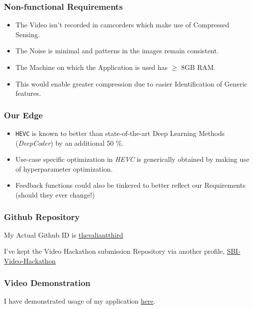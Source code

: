 \documentclass{beamer}
\begin{document}
\begin{frame}
    \frametitle{Non-functional Requirements}

    \begin{itemize}
        \item The Video isn't recorded in camcorders which make use of Compressed Sensing.
        \item The Noise is minimal and patterns in the images remain consistent.
        \item The Machine on which the Application is used has $\geq$ 8GB RAM.
        \item This would enable greater compression due to easier Identification of Generic features.
    \end{itemize}
\end{frame}

\begin{frame}
    \frametitle{Our Edge}
    \begin{itemize}
        \item \texttt{HEVC} is known to better than state-of-the-art Deep Learning Methods (\textit{DeepCoder}) by an additional 50 $\%$.
        \pause
        \item Use-case specific optimization in \textit{HEVC} is generically obtained by making use of hyperparameter optimization.
        \pause
        \item Feedback functions could also be tinkered to better reflect our Requirements (should they ever change!)
    \end{itemize}
\end{frame}

\begin{frame}
    \frametitle{Github Repository}

    My Actual Github ID is \href{https://github.com/thevaliantthird}{thevaliantthird}

    I've kept the Video Hackathon submission Repository via another profile, \href{https://github.com/theintrepidthird/SBI-Video-Hackathon}{SBI-Video-Hackathon}
\end{frame}

\begin{frame}
    \frametitle{Video Demonstration}

    I have demonstrated usage of my application \href{https://github.com/theintrepidthird/SBI-Video-Hackathon/blob/main/demonstration.mp4}{here}.
\end{frame}
\end{document}

